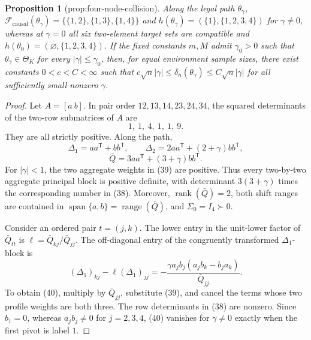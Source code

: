\documentclass{article}
\newtheorem{proposition}{Proposition}
\begin{document}
\begin{proposition}[prop:four-node-collision]\label{prop:four-node-collision}
Along the legal path \(\theta_{\gamma}\), \(\mathcal F_{\mathrm{causal}}(\theta_{\gamma})=\{\{1,2\},\{1,3\},\{1,4\}\}\) and \(h(\theta_{\gamma})=(\{1\},\{1,2,3,4\})\) for \(\gamma\ne0\), whereas at \(\gamma=0\) all six two-element target sets are compatible and \(h(\theta_0)=(\varnothing,\{1,2,3,4\})\).  If the fixed constants \(m,M\) admit \(\gamma_0>0\) such that \(\theta_{\gamma}\in\Theta_K\) for every \(|\gamma|\le\gamma_0\), then, for equal environment sample sizes, there exist constants \(0<c<C<\infty\) such that \(c\sqrt n|\gamma|\le\delta_n(\theta_{\gamma})\le C\sqrt n|\gamma|\) for all sufficiently small nonzero \(\gamma\).
\end{proposition}
\begin{proof}
Let \(A=[a\ b]\).  In pair order \(12,13,14,23,24,34\), the squared determinants of the two-row submatrices of \(A\) are
\[
 1,\ 1,\ 4,\ 1,\ 1,\ 9. \tag{38}
\]
They are all strictly positive.  Along the path,
\[
 \Delta_1=aa^{\mathsf T}+bb^{\mathsf T},\qquad
 \Delta_2=2aa^{\mathsf T}+(2+\gamma)bb^{\mathsf T},
\]
\[
 \bar Q=3aa^{\mathsf T}+(3+\gamma)bb^{\mathsf T}. \tag{39}
\]
For \(|\gamma|<1\), the two aggregate weights in (39) are positive.  Thus every two-by-two aggregate principal block is positive definite, with determinant \(3(3+\gamma)\) times the corresponding number in (38).  Moreover, \(\operatorname{rank}(\bar Q)=2\), both shift ranges are contained in \(\operatorname{span}\{a,b\}=\operatorname{range}(\bar Q)\), and \(\Sigma_0=I_4\succ0\).

Consider an ordered pair \(t=(j,k)\).  The lower entry in the unit-lower factor of \(\bar Q_{tt}\) is \(\ell=\bar Q_{kj}/\bar Q_{jj}\).  The off-diagonal entry of the congruently transformed \(\Delta_1\)-block is
\[
 (\Delta_1)_{kj}-\ell(\Delta_1)_{jj}
 =-\frac{\gamma a_jb_j(a_jb_k-b_ja_k)}{\bar Q_{jj}}. \tag{40}
\]
To obtain (40), multiply by \(\bar Q_{jj}\), substitute (39), and cancel the terms whose two profile weights are both three.  The row determinants in (38) are nonzero.  Since \(b_1=0\), whereas \(a_jb_j\ne0\) for \(j=2,3,4\), (40) vanishes for \(\gamma\ne0\) exactly when the first pivot is label \(1\).


\end{proof}
\end{document}
